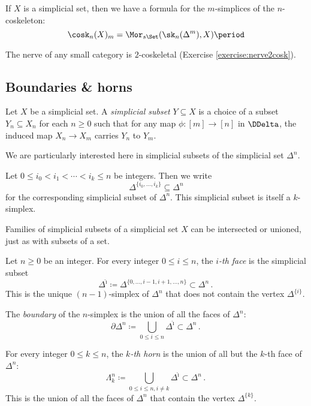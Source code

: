 \begin{eg}
  If $X$ is a simplicial set, then we have a formula for the $m$-simplices of the $n$-coskeleton:
  \[
    \cosk_n(X)_m = \Mor_{s\Set}(\sk_n(\Delta^m), X) \period
  \]
\end{eg}

\begin{eg}
  The nerve of any small category is $2$-coskeletal (Exercise \ref{exercise:nerve2cosk}).
\end{eg}

\subsection{Boundaries \& horns}%
\label{sub:Boundariesandhorns}

\begin{definition}
  Let $X$ be a simplicial set.
  A \emph{simplicial subset} $Y \subseteq X$ is a choice of a subset $Y_n \subseteq X_n$ for each $n \geq 0$ such that for any map $\phi \colon [m] \to [n]$ in $\DDelta$, the induced map $X_n \to X_m$ carries $Y_n$ to $Y_m$.
\end{definition}

\noindent We are particularly interested here in simplicial subsets of the simplicial set $\Delta^n$.

\begin{notation}
  Let $0 \leq i_0 < i_1 < \cdots < i_k \leq n$ be integers.
  Then we write
  \[
    \Delta^{\{i_0, \dots, i_k\}} \subseteq \Delta^n
  \]
  for the corresponding simplicial subset of $\Delta^n$.
  This simplicial subset is itself a $k$-simplex.
\end{notation}

Families of simplicial subsets of a simplicial set $X$ can be intersected or unioned, just as with subsets of a set.

\begin{definition}
  Let $n \geq 0$ be an integer.
  For every integer $0 \leq i \leq n$, the \emph{$i$-th face} is the simplicial subset 
  \[
    \Delta^{\hat{\imath}} \coloneq \Delta^{\{0,\dots,i-1,i+1,\dots,n\}} \subset \Delta^n \period
  \]
  This is the unique $(n-1)$-simplex of $\Delta^n$ that does not contain the vertex $\Delta^{\{i\}}$.

  The \emph{boundary} of the $n$-simplex is the union of all the faces of $\Delta^n$:
  \[
    \partial \Delta^n \coloneq \bigcup_{0 \leq i \leq n} \Delta^{\hat{\imath}} \subset \Delta^n \period
  \]

  For every integer $0 \leq k \leq n$, the \emph{$k$-th horn} is the union of all but the $k$-th face of $\Delta^n$:
  \[
    \Lambda^n_k \coloneq \bigcup_{0 \leq i \leq n, i \neq k} \Delta^{\hat{\imath}} \subset \Delta^n \period
  \]
  This is the union of all the faces of $\Delta^n$ that contain the vertex $\Delta^{\{k\}}$. 
\end{definition}

